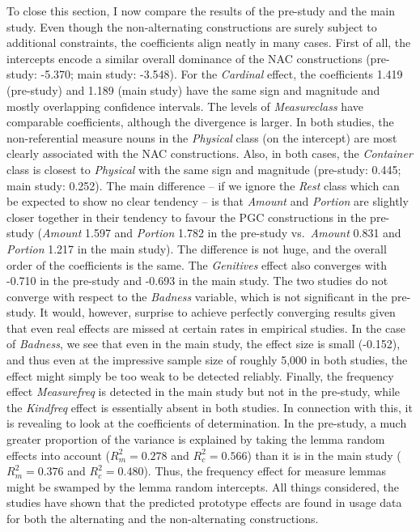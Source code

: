 To close this section, I now compare the results of the pre-study and the main study.
Even though the non-alternating constructions are surely subject to additional constraints, the coefficients align neatly in many cases.
First of all, the intercepts encode a similar overall dominance of the NAC constructions (pre-study: -5.370; main study: -3.548).
For the \textit{Cardinal} effect, the coefficients 1.419 (pre-study) and 1.189 (main study) have the same sign and magnitude and mostly overlapping confidence intervals.
The levels of \textit{Measureclass} have comparable coefficients, although the divergence is larger.
In both studies, the non-referential measure nouns in the \textit{Physical} class (on the intercept) are most clearly associated with the NAC constructions.
Also, in both cases, the \textit{Container} class is closest to \textit{Physical} with the same sign and magnitude (pre-study: 0.445; main study: 0.252).
The main difference -- if we ignore the \textit{Rest} class which can be expected to show no clear tendency -- is that \textit{Amount} and \textit{Portion} are slightly closer together in their tendency to favour the PGC constructions in the pre-study (\textit{Amount} 1.597 and \textit{Portion} 1.782 in the pre-study vs.\ \textit{Amount} 0.831 and \textit{Portion} 1.217 in the main study).
The difference is not huge, and the overall order of the coefficients is the same.
The \textit{Genitives} effect also converges with -0.710 in the pre-study and -0.693 in the main study.
The two studies do not converge with respect to the \textit{Badness} variable, which is not significant in the pre-study.
It would, however, surprise to achieve perfectly converging results given that even real effects are missed at certain rates in empirical studies.
In the case of \textit{Badness}, we see that even in the main study, the effect size is small (-0.152), and thus even at the impressive sample size of roughly 5,000 in both studies, the effect might simply be too weak to be detected reliably.
Finally, the frequency effect \textit{Measurefreq} is detected in the main study but not in the pre-study, while the \textit{Kindfreq} effect is essentially absent in both studies.
In connection with this, it is revealing to look at the coefficients of determination.
In the pre-study, a much greater proportion of the variance is explained by taking the lemma random effects into account ($R^2_m=0.278$ and $R^2_c=0.566$) than it is in the main study ($R^2_m=0.376$ and $R^2_c=0.480$).
Thus, the frequency effect for measure lemmas might be swamped by the lemma random intercepts.
All things considered, the studies have shown that the predicted prototype effects are found in usage data for both the alternating and the non-alternating constructions.
